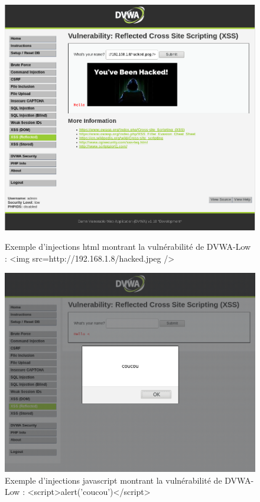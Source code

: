 \begin{figure}[H]
	\begin{center}
		\label{}
		\includegraphics[scale=\scaledvwa]{images/xss/hack1.png}
		\caption{Exemple d'injections html montrant la vulnérabilité de DVWA-Low : <img src=http://192.168.1.8/hacked.jpeg />} 
	\end{center}
\end{figure}

\begin{figure}[H]
	\begin{center}
		\includegraphics[scale=\scaledvwa]{images/xss/hack2.png}
		\caption{Exemple d'injections javascript montrant la vulnérabilité de DVWA-Low : <script>alert('coucou')</script>} 
		\label{hack2}
	\end{center}
\end{figure}

